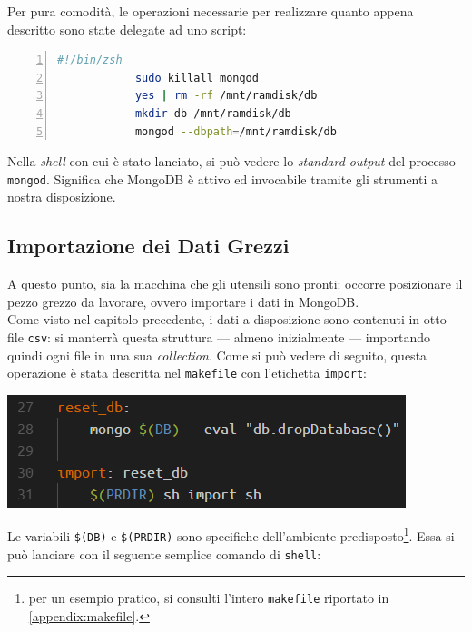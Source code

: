 		Per pura comodità, le operazioni necessarie per realizzare quanto appena descritto sono state delegate ad uno script:

		\begin{lstlisting}[language=bash,caption={script di lancio di un server MongoDB}, numbers=left, stepnumber=1]
			#!/bin/zsh
			sudo killall mongod
			yes | rm -rf /mnt/ramdisk/db
			mkdir db /mnt/ramdisk/db
			mongod --dbpath=/mnt/ramdisk/db
		\end{lstlisting}

		\vspace{0.3cm}

		Nella \textit{shell} con cui è stato lanciato, si può vedere lo \textit{standard output} del processo \texttt{mongod}. Significa che MongoDB è attivo ed invocabile tramite gli strumenti a nostra disposizione.

	\subsection{Importazione dei Dati Grezzi}

		A questo punto, sia la macchina che gli utensili sono pronti: occorre posizionare il pezzo grezzo da lavorare, ovvero importare i dati in MongoDB. \\

		Come visto nel capitolo precedente, i dati a disposizione sono contenuti in otto file \texttt{csv}: si manterrà questa struttura --- almeno inizialmente --- importando quindi ogni file in una sua \textit{collection}. Come si può vedere di seguito, questa operazione è stata descritta nel \texttt{makefile} con l'etichetta \texttt{import}:

		\begin{center}
			\includegraphics[scale=0.7]{img/import.png}
		\end{center}

		Le variabili \texttt{\$(DB)} e \texttt{\$(PRDIR)} sono specifiche dell'ambiente predisposto\footnote{per un esempio pratico, si consulti l'intero \texttt{makefile} riportato in \ref{appendix:makefile}.}. Essa si può lanciare con il seguente semplice comando di \texttt{shell}:

